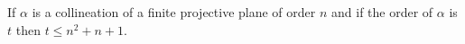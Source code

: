 If $\alpha$ is a collineation of a finite projective plane of order $n$ and if the order of $\alpha$ is $t$ then $t \leq n^2 + n + 1$.
